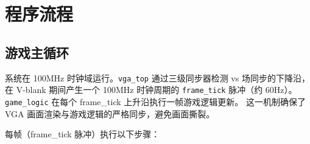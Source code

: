 \documentclass[12pt,a4paper]{ctexart}
\begin{document}
\section{程序流程}

\subsection{游戏主循环}

系统在 100MHz 时钟域运行。\texttt{vga\_top} 通过三级同步器检测 vs 场同步的下降沿，
在 V-blank 期间产生一个 100MHz 时钟周期的 \texttt{frame\_tick} 脉冲（约 60Hz）。
\texttt{game\_logic} 在每个 frame\_tick 上升沿执行一帧游戏逻辑更新。
这一机制确保了 VGA 画面渲染与游戏逻辑的严格同步，避免画面撕裂。

每帧（frame\_tick 脉冲）执行以下步骤：
\end{document}

